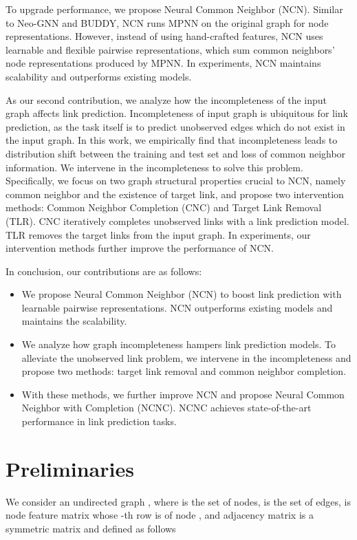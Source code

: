 \documentclass{article}
\theoremstyle{plain}
\theoremstyle{definition}
\theoremstyle{remark}
\begin{document}
To upgrade performance, we propose Neural Common Neighbor (NCN). Similar to Neo-GNN and BUDDY, NCN runs MPNN on the original graph for node representations. However, instead of using hand-crafted features, NCN uses learnable and flexible pairwise representations, which sum common neighbors' node representations produced by MPNN. In experiments, NCN maintains scalability and outperforms existing models. 

As our second contribution, we analyze how the incompleteness of the input graph affects link prediction. Incompleteness of input graph is ubiquitous for link prediction, as the task itself is to predict unobserved edges which do not exist in the input graph. In this work, we empirically find that incompleteness leads to distribution shift between the training and test set and loss of common neighbor information. We intervene in the incompleteness to solve this problem. Specifically, we focus on two graph structural properties crucial to NCN, namely common neighbor and the existence of target link, and propose two intervention methods: Common Neighbor Completion (CNC) and Target Link Removal (TLR). CNC iteratively completes unobserved links with a link prediction model. TLR removes the target links from the input graph. In experiments, our intervention methods further improve the performance of NCN.

In conclusion, our contributions are as follows:
\begin{itemize}[itemsep=0pt,topsep=0pt,parsep=0pt]
    \item We propose Neural Common Neighbor (NCN) to boost link prediction with learnable pairwise representations. NCN outperforms existing models and maintains the scalability.
    \item We analyze how graph incompleteness hampers link prediction models. 
    To alleviate the unobserved link problem, we intervene in the incompleteness and propose two methods: target link removal and common neighbor completion. 
    \item With these methods, we further improve NCN and propose Neural Common Neighbor with Completion (NCNC). NCNC achieves state-of-the-art performance in link prediction tasks. 
\end{itemize}
\section{Preliminaries}
We consider an undirected graph , where  is the set of  nodes,  is the set of edges,  is node feature matrix whose -th row  is of node , and adjacency matrix  is a symmetric matrix and defined as follows
\end{document}
